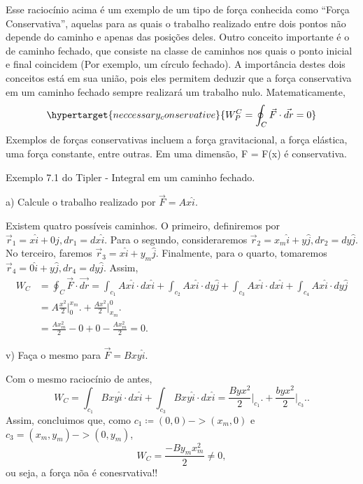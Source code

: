 \documentclass[physics_notes.tex]{subfiles}
\begin{document}
Esse raciocínio acima é um exemplo de um tipo de força conhecida como ``Força Conservativa'', aquelas para as quais o trabalho realizado entre dois pontos
não depende do caminho e apenas das posições deles.  Outro conceito importante é o de caminho fechado, que consiste na classe de caminhos nos quais o ponto inicial
e final coincidem (Por exemplo, um círculo fechado). A importância destes dois conceitos está em sua união, pois eles permitem deduzir que a força conservativa em
um caminho fechado sempre realizará um trabalho nulo. Matematicamente,
\[
	\hypertarget{neccessary_conservative}{W_{P}^{C} = \oint_{C}\vec{F}\cdot \vec{dr} = 0}
\]
Exemplos de forças conservativas incluem a força gravitacional, a força elástica, uma força constante, entre outras.
Em uma dimensão, F = F(x) é conservativa.
\begin{example}
	Exemplo 7.1 do Tipler - Integral em um caminho fechado.

	a) Calcule o trabalho realizado por \(\vec{F} = Ax \hat{i}\).

	Existem quatro possíveis caminhos. O primeiro, definiremos por \(\vec{r}_{1} = x\hat{i} + 0\hat{j}, dr_{1} = dx\hat{i}\). Para o segundo, consideraremos
	\(\vec{r}_{2} = x_{m}\hat{i} + y\hat{j}, dr_{2} = dy\hat{j}.\) No terceiro, faremos \(\vec{r}_{3} = x\hat{i} + y_{m}\hat{j}\). Finalmente, para o quarto,
	tomaremos \(\vec{r}_{4} = 0\hat{i} + y\hat{j}, dr_{4} = dy\hat{j}.\) Assim,
	\begin{align*}
		W_{C} & = \oint_{C}\vec{F}\cdot \vec{dr} = \int_{c_{1}}^{}Ax\hat{i}\cdot dx\hat{i} + \int_{c_{2}}^{}Ax\hat{i}\cdot dy\hat{j} + \int_{c_{3}}^{}Ax\hat{i}\cdot dx\hat{i}+ \int_{c_{4}}^{}Ax\hat{i}\cdot dy\hat{j} \\
		      & = A \frac{x^{2}}{2}\biggl|_{0}^{x_{m}}\biggr. + \frac{Ax^{2}}{2}\biggl|_{x_{m}}^{0}\biggr.                                                                                                              \\
		      & = \frac{Ax_{m}^{2}}{2} - 0 + 0 - \frac{Ax_{m}^{2}}{2} = 0.
	\end{align*}

	v) Faça o mesmo para \(\vec{F} = Bxy\hat{i}\).

	Com o mesmo raciocínio de antes,
	\[
		W_{C} = \int_{c_{1}}^{}Bxy\hat{i}\cdot dx\hat{i} + \int_{c_{3}}^{}Bxy\hat{i}\cdot dx\hat{i} = \frac{Byx^{2}}{2}\biggl|_{c_{1}}^{}\biggr. + \frac{byx^{2}}{2}\biggl|_{c_{3}}^{}\biggr. .
	\]
	Assim, concluimos que, como \(c_{1} \coloneqq (0, 0)->(x_{m}, 0)\) e \(c_{3} = (x_{m}, y_{m})->(0, y_{m})\),
	\[
		W_{C} = \frac{-By_{m}x_{m}^{2}}{2}\neq0,
	\]
	ou seja, a força nõa é conesrvativa!!
\end{example}
\end{document}
